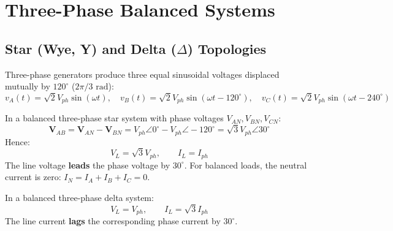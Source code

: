 \section{Three-Phase Balanced Systems}

\subsection{Star (Wye, Y) and Delta ($\Delta$) Topologies}
Three-phase generators produce three equal sinusoidal voltages displaced mutually by $120^\circ$ ($2\pi/3\text{ rad}$):
\begin{equation}
v_A(t) = \sqrt{2}V_{ph}\sin(\omega t), \quad v_B(t) = \sqrt{2}V_{ph}\sin(\omega t - 120^\circ), \quad v_C(t) = \sqrt{2}V_{ph}\sin(\omega t - 240^\circ)
\end{equation}

\begin{theorem}
In a balanced three-phase star system with phase voltages $V_{AN}, V_{BN}, V_{CN}$:
\begin{equation}
\mathbf{V}_{AB} = \mathbf{V}_{AN} - \mathbf{V}_{BN} = V_{ph}\angle 0^\circ - V_{ph}\angle -120^\circ = \sqrt{3}V_{ph}\angle 30^\circ
\end{equation}
Hence:
\begin{equation}
V_L = \sqrt{3} V_{ph}, \qquad I_L = I_{ph}
\end{equation}
The line voltage \textbf{leads} the phase voltage by $30^\circ$. For balanced loads, the neutral current is zero: $I_N = I_A + I_B + I_C = 0$.
\end{theorem}

\begin{theorem}
In a balanced three-phase delta system:
\begin{equation}
V_L = V_{ph}, \qquad I_L = \sqrt{3} I_{ph}
\end{equation}
The line current \textbf{lags} the corresponding phase current by $30^\circ$.
\end{theorem}

